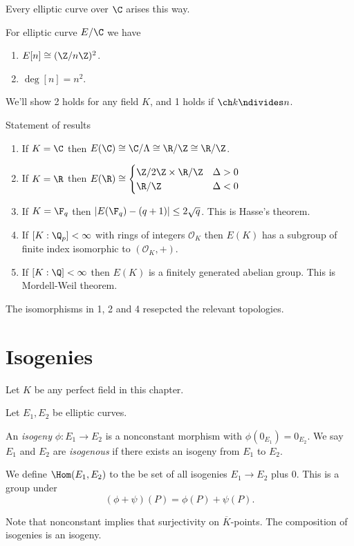 \documentclass[a4paper]{article}
\theoremstyle{definition}
\theoremstyle{theorem}
\begin{document}
\begin{theorem}
  Every elliptic curve over \(\C\) arises this way.
\end{theorem}

For elliptic curve \(E/\C\) we have
\begin{enumerate}
\item \(E[n] \cong (\Z/n\Z)^2\).
\item \(\deg [n] = n^2\).
\end{enumerate}
We'll show 2 holds for any field \(K\), and 1 holds if \(\ch k \ndivides n\).

Statement of results
\begin{enumerate}
\item If \(K = \C\) then \(E(\C) \cong \C/\Lambda \cong \R/\Z \cong \R/\Z\).
\item If \(K = \R\) then \(E(\R) \cong
  \begin{cases}
    \Z/2\Z \times \R/\Z & \Delta > 0 \\
    \R/\Z & \Delta < 0
  \end{cases}
  \)
\item If \(K = \F_q\) then \(|E(\F_q) - (q + 1)| \leq 2 \sqrt q\). This is Hasse's theorem.
\item If \([K: \Q_p] < \infty\) with rings of integers \(\mathcal O_K\) then \(E(K)\) has a subgroup of finite index isomorphic to \((\mathcal O_K, +)\).
\item If \([K: \Q] < \infty\) then \(E(K)\) is a finitely generated abelian group. This is Mordell-Weil theorem.
\end{enumerate}

\begin{remark}
  The isomorphisms in 1, 2 and 4 resepcted the relevant topologies.
\end{remark}

\section{Isogenies}

Let \(K\) be any perfect field in this chapter.

Let \(E_1, E_2\) be elliptic curves.

\begin{definition}[isogeny]
  An \emph{isogeny} \(\phi: E_1 \to E_2\) is a nonconstant morphism with \(\phi(0_{E_1}) = 0_{E_2}\). We say \(E_1\) and \(E_2\) are \emph{isogenous} if there exists an isogeny from \(E_1\) to \(E_2\).

  We define \(\Hom(E_1, E_2)\) to the be set of all isogenies \(E_1 \to E_2\) plus \(0\). This is a group under
  \[
    (\phi + \psi)(P) = \phi(P) + \psi(P).
  \]
\end{definition}
Note that nonconstant implies that surjectivity on \(\overline K\)-points. The composition of isogenies is an isogeny.
\end{document}
